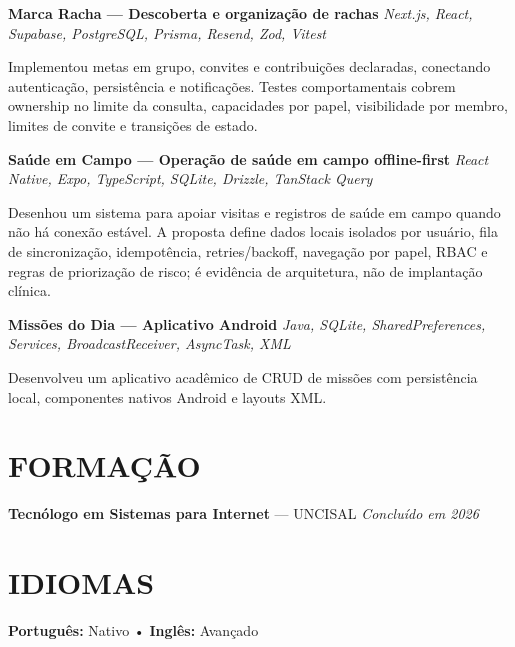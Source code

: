 \documentclass[10pt,a4paper]{article}
\begin{document}
\vspace{0.5pt}

\noindent
\textbf{Marca Racha — Descoberta e organização de rachas}
\hfill
\textit{Next.js, React, Supabase, PostgreSQL, Prisma, Resend, Zod, Vitest}

\footnotesize

Implementou metas em grupo, convites e contribuições declaradas, conectando autenticação, persistência e notificações. Testes comportamentais cobrem ownership no limite da consulta, capacidades por papel, visibilidade por membro, limites de convite e transições de estado.

\vspace{0.5pt}

\noindent
\textbf{Saúde em Campo — Operação de saúde em campo offline-first}
\hfill
\textit{React Native, Expo, TypeScript, SQLite, Drizzle, TanStack Query}

\footnotesize

Desenhou um sistema para apoiar visitas e registros de saúde em campo quando não há conexão estável. A proposta define dados locais isolados por usuário, fila de sincronização, idempotência, retries/backoff, navegação por papel, RBAC e regras de priorização de risco; é evidência de arquitetura, não de implantação clínica.

\vspace{0.5pt}

\noindent
\textbf{Missões do Dia — Aplicativo Android}
\hfill
\textit{Java, SQLite, SharedPreferences, Services, BroadcastReceiver, AsyncTask, XML}

\footnotesize

Desenvolveu um aplicativo acadêmico de CRUD de missões com persistência local, componentes nativos Android e layouts XML.

\section*{FORMAÇÃO}

\noindent
\textbf{Tecnólogo em Sistemas para Internet} — UNCISAL
\hfill
\textit{Concluído em 2026}


\section*{IDIOMAS}

\noindent
\textbf{Português:} Nativo
\quad • \quad
\textbf{Inglês:} Avançado 
\end{document}
